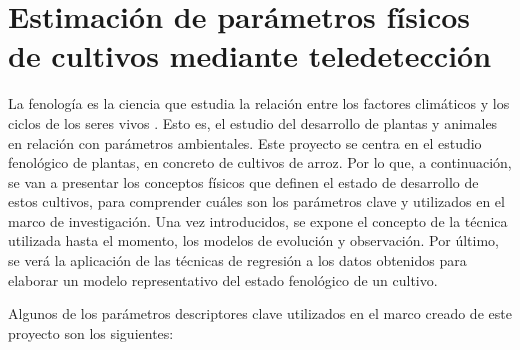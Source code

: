 \section{Estimación de parámetros físicos de cultivos mediante teledetección}

\par La fenología es la ciencia que estudia la relación entre los factores climáticos y los ciclos de los seres vivos \citep{feno}. Esto es, el estudio del desarrollo de plantas y animales en relación con parámetros ambientales. Este proyecto se centra en el estudio fenológico de plantas, en concreto de cultivos de arroz.
Por lo que, a continuación, se van a presentar los conceptos físicos que definen el estado de desarrollo de estos cultivos, para comprender cuáles son los parámetros clave y utilizados en el marco de investigación. Una vez introducidos, se expone el concepto de la técnica utilizada hasta el momento, los modelos de evolución y observación. Por último, se verá la aplicación de las técnicas de regresión a los datos obtenidos para elaborar un modelo representativo del estado fenológico de un cultivo.
\\
\par Algunos de los parámetros descriptores clave utilizados en el marco creado de este proyecto son los siguientes: 
